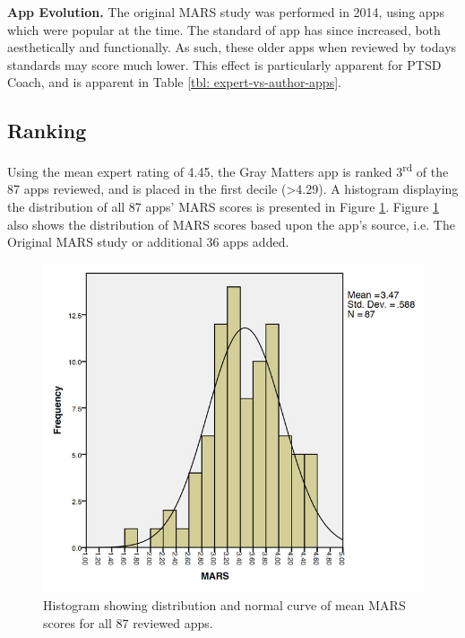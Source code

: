 \textbf{App Evolution.}
The original MARS study was performed in 2014, using apps which were popular at the time. The standard of app has since increased, both aesthetically and functionally. As such, these older apps when reviewed by todays standards may score much lower. This effect is particularly apparent for PTSD Coach, and is apparent in Table \ref{tbl: expert-vs-author-apps}. 

\subsection{Ranking}
Using the mean expert rating of 4.45, the Gray Matters app is ranked 3\textsuperscript{rd} of the 87 apps reviewed, and is placed in the first decile (\textgreater 4.29). A histogram displaying the distribution of all 87 apps' MARS scores is presented in Figure \ref{fig: allapps-histogram}. Figure \ref{fig: allapps-histogram} also shows the distribution of MARS scores based upon the app's source, i.e. The Original MARS study or additional 36 apps added.

\begin{figure}[h]
    \centering
    \includegraphics[scale=0.4, angle=0]{Files/prevention-study-2/figures/allapps-histogram}
    \caption{Histogram showing distribution and normal curve of mean MARS scores for all 87 reviewed apps.}
    \label{fig: allapps-histogram}
\end{figure}

